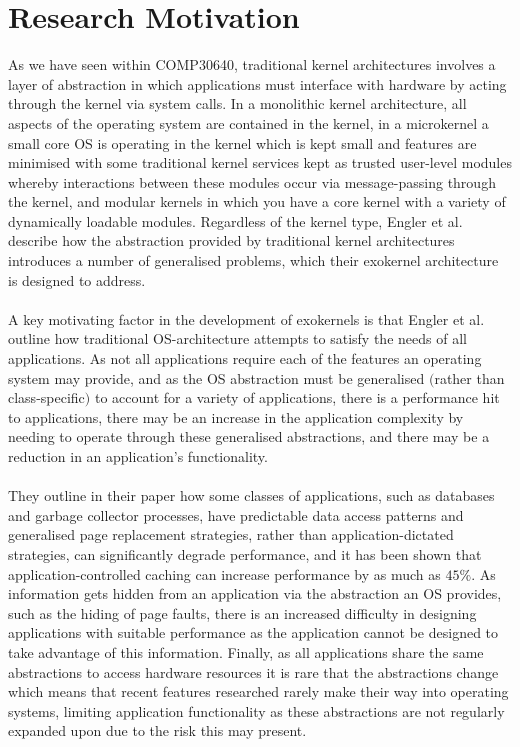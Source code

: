 \documentclass[11pt]{article}
\theoremstyle{plain}
\theoremstyle{definition}
\begin{document}
\section{Research Motivation}\label{section:ResearchMotive}
As we have seen within COMP30640, traditional kernel architectures involves a layer of abstraction in which applications must interface with hardware by acting through the kernel via system calls. In a monolithic kernel architecture, all aspects of the operating system are contained in the kernel, in a microkernel a small core OS is operating in the kernel which is kept small and features are minimised with some traditional kernel services kept as trusted user-level modules whereby interactions between these modules occur via message-passing through the kernel, and modular kernels in which you have a core kernel with a variety of dynamically loadable modules. Regardless of the kernel type, Engler et al. describe how the abstraction provided by traditional kernel architectures introduces a number of generalised problems, which their exokernel architecture is designed to address.\\
\\
A key motivating factor in the development of exokernels is that Engler et al. outline how traditional OS-architecture attempts to satisfy the needs of all applications. As not all applications require each of the features an operating system may provide, and as the OS abstraction must be generalised $($rather than class-specific$)$ to account for a variety of applications, there is a performance hit to applications, there may be an increase in the application complexity by needing to operate through these generalised abstractions, and there may be a reduction in an application's functionality.\\
\\
They outline in their paper how some classes of applications, such as databases and garbage collector processes, have predictable data access patterns and generalised page replacement strategies, rather than application-dictated strategies, can significantly degrade performance, and it has been shown that application-controlled caching can increase performance by as much as $45\%$. As information gets hidden from an application via the abstraction an OS provides, such as the hiding of page faults, there is an increased difficulty in designing applications with suitable performance as the application cannot be designed to take advantage of this information. Finally, as all applications share the same abstractions to access hardware resources it is rare that the abstractions change which means that recent features researched rarely make their way into operating systems, limiting application functionality as these abstractions are not regularly expanded upon due to the risk this may present.
\pagebreak
\end{document}
